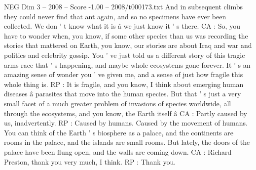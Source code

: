 \begin{textsample}{NEG Dim 3 – 2008 – Score -1.00 – 2008/t000173.txt}
And in subsequent climbs they could never find that ant again, and so no specimens have ever been collected.
We don ' t know what it is â we just know it ' s there.
CA : So, you have to wonder when, you know, if some other species than us was recording the stories that mattered on Earth, you know, our stories are about Iraq and war and politics and celebrity gossip.
You ' ve just told us a different story of this tragic arms race that ' s happening, and maybe whole ecosystems gone forever.
It ' s an amazing sense of wonder you ' ve given me, and a sense of just how fragile this whole thing is.
RP : It is fragile, and you know, I think about emerging human diseases â parasites that move into the human species.
But that ' s just a very small facet of a much greater problem of invasions of species worldwide, all through the ecosystems, and you know, the Earth itself â CA : Partly caused by us, inadvertently.
RP : Caused by humans.
Caused by the movement of humans.
You can think of the Earth ' s biosphere as a palace, and the continents are rooms in the palace, and the islands are small rooms.
But lately, the doors of the palace have been flung open, and the walls are coming down.
CA : Richard Preston, thank you very much, I think.
RP : Thank you.

\end{textsample}
